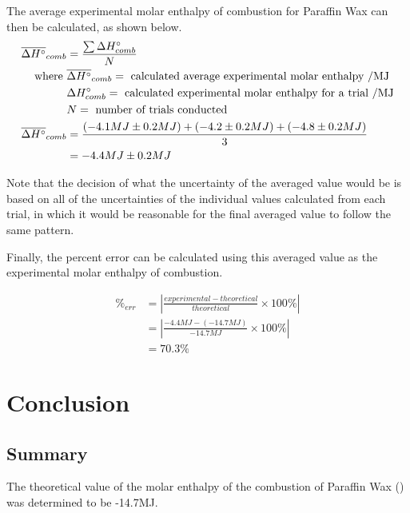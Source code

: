 \documentclass[
	letterpaper, %
	12pt, %
]{CSUniSchoolLabReport}
\begin{document}
\par The average experimental molar enthalpy of combustion for Paraffin Wax can then be calculated, as shown below.
\begin{align*}
  \overline{\Delta H\degree}_{comb} & = \frac{\sum \Delta H\degree_{comb}}{N}
  \\
  \text{where }                     & \overline{\Delta H\degree}_{comb} = \text{ calculated average experimental molar enthalpy /MJ}
  \\
                                    & \Delta H\degree_{comb} = \text{ calculated experimental molar enthalpy for a trial /MJ}
  \\
                                    & N = \text{ number of trials conducted}
  \\
  \overline{\Delta H\degree}_{comb} & = \frac{(-4.1MJ \pm 0.2 MJ) + (-4.2 \pm 0.2 MJ) + (-4.8 \pm 0.2 MJ)}{3}
  \\
                                    & = -4.4MJ \pm 0.2 MJ
\end{align*}

\par Note that the decision of what the uncertainty of the averaged value would be is based on all of
the uncertainties of the individual values calculated from each trial, in which it would be reasonable
for the final averaged value to follow the same pattern.
\\
\par Finally, the percent error can be calculated using this averaged value as the experimental molar enthalpy of combustion.

\begin{align*}
  \%_{err} & = \left|\frac{experimental - theoretical}{theoretical} \times 100\%\right|
  \\
           & = \left|\frac{-4.4MJ - (-14.7MJ)}{-14.7MJ} \times 100\%\right|
  \\
           & = 70.3\%
\end{align*}

\section{Conclusion}

\subsection{Summary}

\par
The theoretical value of the molar enthalpy of the combustion of Paraffin Wax
() was determined to be -14.7MJ.
\end{document}

